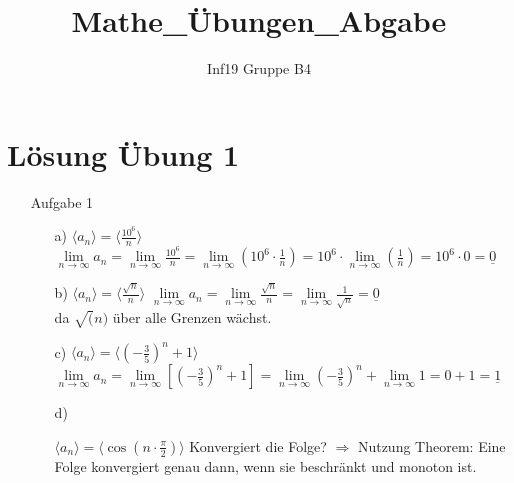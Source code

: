 \documentclass{scrreprt}
\title{Mathe\_Übungen\_Abgabe} %
\author{Inf19 Gruppe B4}
\begin{document}
    \maketitle

    \newpage
    \setcounter{page}{1}

    \section*{Lösung Übung 1}
    \begin{enumerate}
        \item[Aufgabe 1] {
            \begin{enumerate}
                \item[a)]{
                    $\langle a_n \rangle = \langle \frac{10^6}{n}\rangle$\newline
                    $\lim \limits_{n \to \infty} a_n =
                    \lim \limits_{n \to \infty} \frac{10^6}{n} =
                    \lim \limits_{n \to \infty} (10^6 \cdot \frac{1}{n} ) =
                    10^6 \cdot \lim \limits_{n \to \infty} (\frac{1}{n}) =
                    10^6 \cdot 0 = \underline{0}$
                }
                \item[b)]{
                    $\langle a_n \rangle = \langle \frac{\sqrt{n}}{n}\rangle$\newline
                    $\lim \limits_{n \to \infty} a_n =
                    \lim \limits_{n \to \infty} \frac{\sqrt{n}}{n} =
                    \lim \limits_{n \to \infty} \frac{1}{\sqrt{n}} =
                    \underline{0}$\\
                    da $\sqrt(n)$ über alle Grenzen wächst.
                }
                \item[c)]{
                    $\langle a_n \rangle =\langle (-\frac{3}{5})^n + 1\rangle$\newline
                    $\lim \limits_{n \to \infty} a_n =
                    \lim \limits_{n \to \infty} [(-\frac{3}{5})^n + 1] =
                    \lim \limits_{n \to \infty} (-\frac{3}{5})^n + \lim \limits_{n \to \infty} 1 =
                    0 + 1 = \underline{1}$
                }
                \item[d)]{
                    $\langle a_n \rangle = \langle\cos(n\cdot\frac{\pi}{2})\rangle$\newline
                    Konvergiert die Folge?\newline
                    $\Rightarrow$ Nutzung Theorem: Eine Folge konvergiert genau dann, wenn sie beschränkt und monoton ist.\newline

}
\end{enumerate}}
\end{enumerate}
\end{document}
